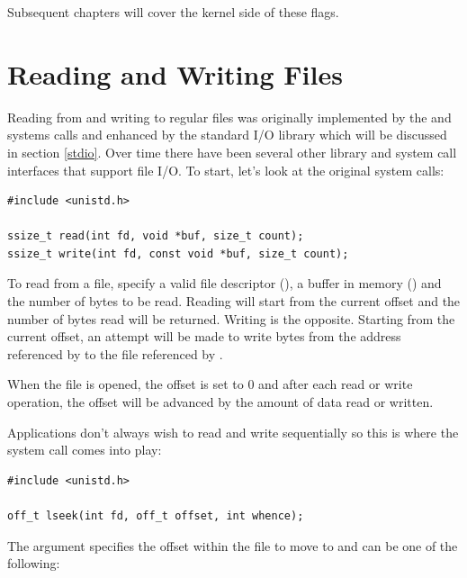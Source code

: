 \noindent
Subsequent chapters will cover the kernel side of these flags.


\section{Reading and Writing Files}

Reading from and writing to regular files was originally implemented by the  and  systems calls and enhanced by the standard I/O library which will be discussed in section \ref{stdio}. Over time there have been several other library and system call interfaces that support file I/O. To start, let's look at the original system calls:

\begin{lstlisting}
#include <unistd.h>

ssize_t read(int fd, void *buf, size_t count);
ssize_t write(int fd, const void *buf, size_t count);
\end{lstlisting}

\noindent
To read from a file, specify a valid file descriptor (), a buffer in memory () and the number of bytes to be read. Reading will start from the current offset and the number of bytes read will be returned. Writing is the opposite. Starting from the current offset, an attempt will be made to write  bytes from the address referenced by  to the file referenced by .

When the file is opened, the offset is set to 0 and after each read or write operation, the offset will be advanced by the amount of data read or written.

Applications don't always wish to read and write sequentially so this is where the  system call comes into play:

\begin{lstlisting}
#include <unistd.h>

off_t lseek(int fd, off_t offset, int whence);
\end{lstlisting}

\noindent
The  argument specifies the offset within the file to move to and  can be one of the following:

